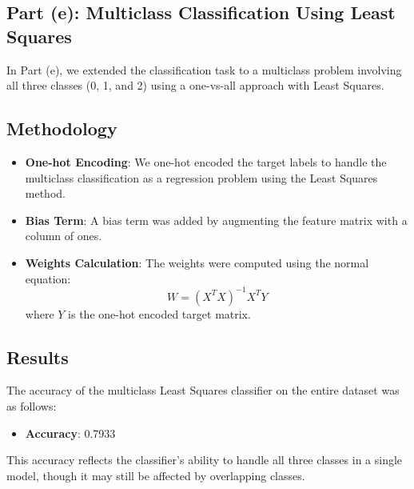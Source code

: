 \documentclass[a4paper, 11pt]{article}
\begin{document}
	\subsection*{Part (e): Multiclass Classification Using Least Squares}
	
	In Part (e), we extended the classification task to a multiclass problem involving all three classes (0, 1, and 2) using a one-vs-all approach with Least Squares.
	
	\subsection*{Methodology}
	
	\begin{itemize}
		\item \textbf{One-hot Encoding}: We one-hot encoded the target labels to handle the multiclass classification as a regression problem using the Least Squares method.
		\item \textbf{Bias Term}: A bias term was added by augmenting the feature matrix with a column of ones.
		\item \textbf{Weights Calculation}: The weights were computed using the normal equation: \[ W = (X^T X)^{-1} X^T Y \] where \( Y \) is the one-hot encoded target matrix.
	\end{itemize}
	
	\subsection*{Results}
	
	The accuracy of the multiclass Least Squares classifier on the entire dataset was as follows:
	
	\begin{itemize}
		\item \textbf{Accuracy}: 0.7933
	\end{itemize}
	
	This accuracy reflects the classifier’s ability to handle all three classes in a single model, though it may still be affected by overlapping classes.
	
	
\end{document}
